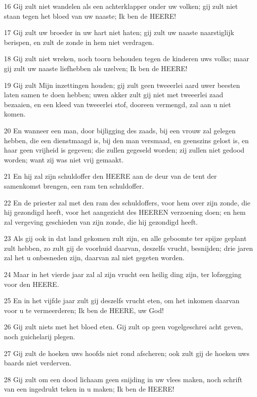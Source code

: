 \par 16 Gij zult niet wandelen als een achterklapper onder uw volken; gij zult niet staan tegen het bloed van uw naaste; Ik ben de HEERE!
\par 17 Gij zult uw broeder in uw hart niet haten; gij zult uw naaste naarstiglijk berispen, en zult de zonde in hem niet verdragen.
\par 18 Gij zult niet wreken, noch toorn behouden tegen de kinderen uws volks; maar gij zult uw naaste liefhebben als uzelven; Ik ben de HEERE!
\par 19 Gij zult Mijn inzettingen houden; gij zult geen tweeerlei aard uwer beesten laten samen te doen hebben; uwen akker zult gij niet met tweeerlei zaad bezaaien, en een kleed van tweeerlei stof, dooreen vermengd, zal aan u niet komen.
\par 20 En wanneer een man, door bijligging des zaads, bij een vrouw zal gelegen hebben, die een dienstmaagd is, bij den man versmaad, en geenszins gelost is, en haar geen vrijheid is gegeven; die zullen gegeseld worden; zij zullen niet gedood worden; want zij was niet vrij gemaakt.
\par 21 En hij zal zijn schuldoffer den HEERE aan de deur van de tent der samenkomst brengen, een ram ten schuldoffer.
\par 22 En de priester zal met den ram des schuldoffers, voor hem over zijn zonde, die hij gezondigd heeft, voor het aangezicht des HEEREN verzoening doen; en hem zal vergeving geschieden van zijn zonde, die hij gezondigd heeft.
\par 23 Als gij ook in dat land gekomen zult zijn, en alle geboomte ter spijze geplant zult hebben, zo zult gij de voorhuid daarvan, deszelfs vrucht, besnijden; drie jaren zal het u onbesneden zijn, daarvan zal niet gegeten worden.
\par 24 Maar in het vierde jaar zal al zijn vrucht een heilig ding zijn, ter lofzegging voor den HEERE.
\par 25 En in het vijfde jaar zult gij deszelfs vrucht eten, om het inkomen daarvan voor u te vermeerderen; Ik ben de HEERE, uw God!
\par 26 Gij zult niets met het bloed eten. Gij zult op geen vogelgeschrei acht geven, noch guichelarij plegen.
\par 27 Gij zult de hoeken uws hoofds niet rond afscheren; ook zult gij de hoeken uws baards niet verderven.
\par 28 Gij zult om een dood lichaam geen snijding in uw vlees maken, noch schrift van een ingedrukt teken in u maken; Ik ben de HEERE!
